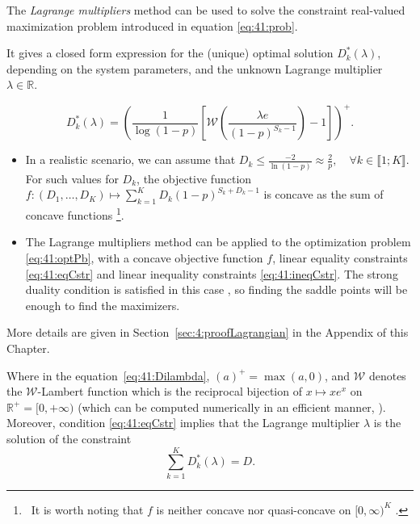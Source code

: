 \begin{proposition}\label{prop:41:Lagrangian}
\begin{leftbar}[propositionbar]  %
    The \emph{Lagrange multipliers} method \cite{BoydVanderberghe04} can be used to solve the constraint real-valued maximization problem introduced in equation \eqref{eq:41:prob}.

    It gives a closed form expression for the (unique) optimal solution $D_k^*(\lambda)$, depending on the system parameters, and the unknown Lagrange multiplier $\lambda \in \mathbb{R}$.

    \begin{equation}\label{eq:41:Dilambda}
        D_k^*(\lambda) = \left(\frac{1}{\log(1-p)}\left[ \mathcal{W}\left(\frac{\lambda e}{(1-p)^{S_k-1}} \right)-1 \right]\right)^{+} .
    \end{equation}
\end{leftbar}  %
\end{proposition}

\begin{smallproof}
\begin{itemize}
    \item
    In a realistic scenario, we can assume that $D_k\leq \frac{-2}{\ln\left(1-p\right)} \approx \frac{2}{p},\quad \forall k\in\llbracket 1;K \rrbracket$. For such values for $D_k$, the objective function $f: (D_1, \dots, D_{K}) \mapsto \sum_{k=1}^{K} D_k (1 - p)^{S_k + D_k -1}$ is concave as the sum of concave functions
    \footnote{~It is worth noting that $f$ is neither concave nor quasi-concave on $[0,\infty)^{K}$ \cite{Luenberger68,Yaari77}.}.
    \item
    The Lagrange multipliers method can be applied to the optimization problem \eqref{eq:41:optPb}, with a concave objective function $f$, linear equality constraints \eqref{eq:41:eqCstr} and linear inequality constraints \eqref{eq:41:ineqCstr}. The strong duality condition is satisfied in this case \cite{BoydVanderberghe04}, so finding the saddle points will be enough to find the maximizers.
    \end{itemize}
    More details are given in Section~\ref{sec:4:proofLagrangian} in the Appendix of this Chapter.
\end{smallproof}

Where in the equation~\eqref{eq:41:Dilambda}, $(a)^{+} = \max(a,0)$, and $\mathcal{W}$ denotes the $\mathcal{W}$-Lambert function which is the reciprocal bijection of $x \mapsto x e^x$ on $\mathbb{R^+} = [0, +\infty)$ (which can be computed numerically in an efficient manner, \cite{Corless96}).
Moreover, condition \eqref{eq:41:eqCstr} implies that the Lagrange multiplier $\lambda$ is the solution of the constraint
\begin{equation}\label{eq:41:constraintLambda}
    \sum_{k=1}^{K} D_k^*(\lambda) = D.
\end{equation}


